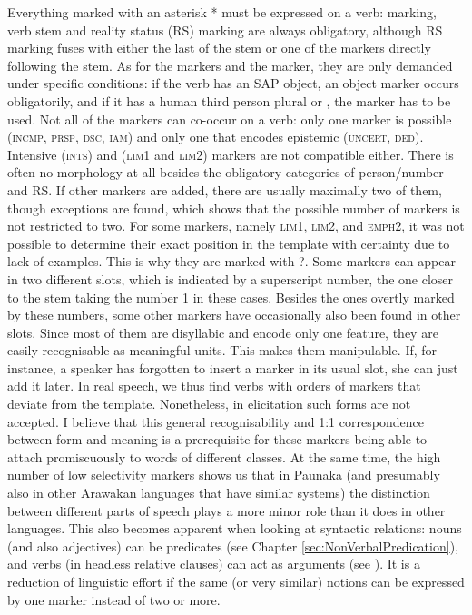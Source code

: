 Everything marked with an asterisk * must be expressed on a verb:  marking, verb stem and reality status (RS) marking are always obligatory, although RS marking fuses with either the last  of the stem or one of the markers directly following the stem. As for the  markers and the  marker, they are only demanded under specific conditions: if the verb has an SAP object, an object marker occurs obligatorily, and if it has a human third person plural  or , the  marker has to be used. Not all of the markers can co-occur on a verb: only one  marker is possible (\textsc{incmp}, \textsc{prsp}, \textsc{dsc}, \textsc{iam}) and only one that encodes epistemic  (\textsc{uncert}, \textsc{ded}). Intensive (\textsc{ints}) and  (\textsc{lim}1 and \textsc{lim}2) markers are not compatible either. There is often no morphology at all besides the obligatory categories of person/number and RS. If other markers are added, there are usually maximally two of them, though exceptions are found, which shows that the possible number of markers is not restricted to two. For some markers, namely \textsc{lim}1, \textsc{lim}2, and \textsc{emph}2, it was not possible to determine their exact position in the template with certainty due to lack of examples. This is why they are marked with ?. Some markers can appear in two different slots, which is indicated by a superscript number, the one closer to the stem taking the number 1 in these cases. Besides the ones overtly marked by these numbers, some other markers have occasionally also been found in other slots. Since most of them are disyllabic and encode only one feature, they are easily recognisable as meaningful units. This makes them manipulable. If, for instance, a speaker has forgotten to insert a marker in its usual slot, she can just add it later. In real speech, we thus find verbs with orders of markers that deviate from the template. Nonetheless, in elicitation such forms are not accepted. I believe that this general recognisability and 1:1 correspondence between form and meaning is a prerequisite for these markers being able to attach promiscuously to words of different classes. At the same time, the high number of low selectivity markers shows us that in Paunaka (and presumably also in other Arawakan languages that have similar systems) the distinction between different parts of speech plays a more minor role than it does in other languages. This also becomes apparent when looking at syntactic relations: nouns (and also adjectives) can be predicates (see Chapter \ref{sec:NonVerbalPredication}), and verbs (in headless relative clauses) can act as arguments (see ). It is a reduction of linguistic effort if the same (or very similar) notions can be expressed by one marker instead of two or more.

